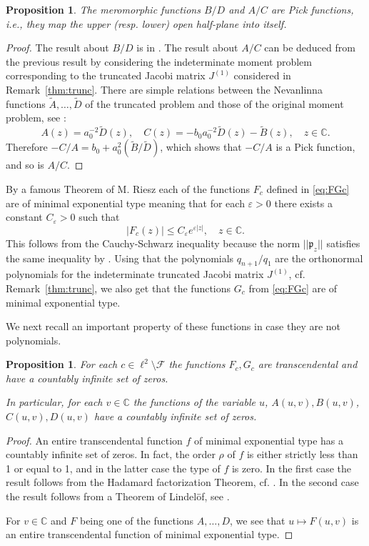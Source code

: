 \documentclass [12pt]{article}
\newtheorem{prop}[thm]{Proposition}
\newcommand{\C}{\mathbb{C}}
\begin{document}
\begin{prop}\label{thm:Pick} The meromorphic functions $B/D$ and $A/C$ are Pick functions, i.e., they map the upper (resp. lower) open half-plane into itself.
\end{prop}

\begin{proof} The result about $B/D$ is in \cite[Proposition 1.3]{B}. The result about $A/C$ can be deduced from the previous result by considering the indeterminate moment problem corresponding to the truncated Jacobi matrix $J^{(1)}$ considered in Remark~\ref{thm:trunc}. There are simple relations between the Nevanlinna functions $\widetilde{A},\ldots,\widetilde{D}$ of the truncated problem and those of the original moment problem, see \cite{Pe}:
\begin{equation*}\label{eq:netr}
A(z)=a_0^{-2}\widetilde{D}(z),\quad C(z)=-b_0 a_0^{-2}\widetilde{D}(z)-\widetilde{B}(z),\quad z\in\C.
\end{equation*}
Therefore $-C/A=b_0+a_0^2(\widetilde{B}/\widetilde{D})$, which shows that $-C/A$ is a Pick function, and so is $A/C$.
\end{proof}


By a famous Theorem of M. Riesz each of the functions $F_c$ defined in \eqref{eq:FGc} are of minimal exponential type meaning that for each $\varepsilon>0$ there exists a constant $C_\varepsilon>0$ such that
$$
|F_c(z)|\le C_\varepsilon e^{\varepsilon |z|},\quad z\in\C.
$$ 
This  follows from the Cauchy-Schwarz inequality because the norm $||\mathfrak{p}_z||$ satisfies the same inequality by \cite[Theorem 2.4.3]{Ak}. Using that the polynomials $q_{n+1}/q_1$ are the orthonormal polynomials for the indeterminate truncated Jacobi matrix $J^{(1)}$, cf. Remark~\ref{thm:trunc}, we also get that the functions $G_c$ from \eqref{eq:FGc} are of minimal exponential type.

We next recall an important property of these functions in case they are not polynomials.

\begin{prop}\label{thm:minexp} For each $c\in \ell^2\setminus\mathcal F$ the functions
$F_c, G_c$ are transcendental  and have a countably infinite set of zeros. 

In particular, for each $v\in\C$ the functions of the variable $u$, $A(u,v), B(u,v)$, $C(u,v), D(u,v)$ have a countably infinite set of zeros. 
\end{prop}

\begin{proof} An entire transcendental function $f$ of minimal exponential type has a countably infinite set of zeros. In fact, the order $\rho$ of $f$ is either strictly less than 1 or equal to 1, and in the latter case the type of $f$ is zero. In the first case the result follows from the Hadamard factorization Theorem, cf. \cite[p.22]{Bo}. In the second case the result follows from a Theorem of Lindel\"{o}f, see \cite[Theorem 2.20.3]{Bo}.  

For $v\in\C$ and $F$ being one of the functions $A,\ldots,D$, we see that $u\mapsto F(u,v)$ is an entire transcendental function of minimal exponential type. 
\end{proof}
\end{document}
